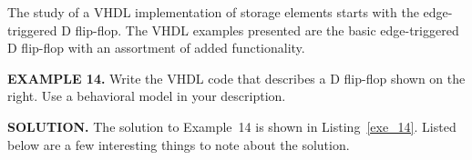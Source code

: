 The study of a VHDL implementation of storage elements starts with the edge-triggered D flip-flop. The VHDL examples presented are the basic edge-triggered D flip-flop with an assortment of added functionality. 
\begin{leftbar}
\begin{minipage}{0.5\linewidth}
\noindent
\textbf{EXAMPLE 14.}
Write the VHDL code that describes a D flip-flop shown on the right. Use a behavioral model in your description.
\end{minipage}
\begin{minipage}{0.47\linewidth}
\begin{flushright}
\end{flushright}
\end{minipage}
\end{leftbar}
\noindent
\textbf{SOLUTION.} The solution to Example~14 is shown in Listing~\ref{exe_14}. Listed below are a few interesting things to note about the solution.
